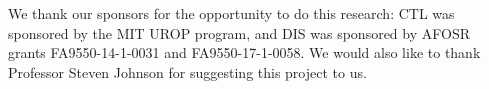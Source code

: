 \documentclass[11pt]{article}
\begin{document}
We thank our sponsors for the opportunity to do this research: CTL was sponsored by the MIT UROP program, and DIS was sponsored by AFOSR grants FA9550-14-1-0031 and FA9550-17-1-0058. We would also like to thank Professor Steven Johnson for suggesting this project to us.

\end{document}

